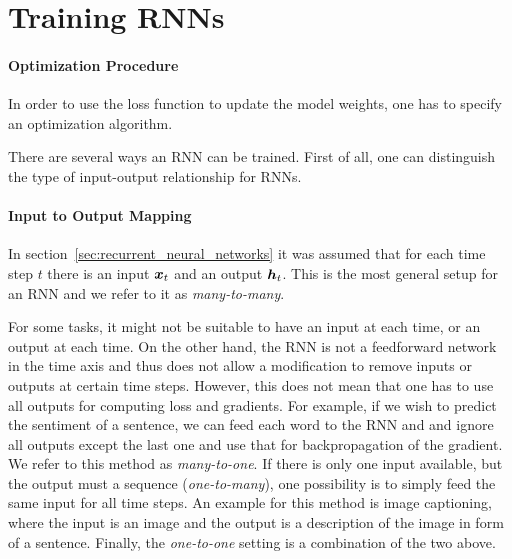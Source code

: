 	\section{Training RNNs}
		
		\paragraph{Optimization Procedure}
		In order to use the loss function to update the model weights, one has to specify an optimization algorithm.

		
		There are several ways an RNN can be trained.
		First of all, one can distinguish the type of input-output relationship for RNNs.
		
		\paragraph{Input to Output Mapping}
		In section~\ref{sec:recurrent_neural_networks} it was assumed that for each time step $t$ there is an input $\bm{x}_t$ and an output $\bm{h}_t$.
		This is the most general setup for an RNN and we refer to it as \emph{many-to-many}. 
		
		For some tasks, it might not be suitable to have an input at each time, or an output at each time.
		On the other hand, the RNN is not a feedforward network in the time axis and thus does not allow a modification to remove inputs or outputs at certain time steps.
		However, this does not mean that one has to use all outputs for computing loss and gradients.
		For example, if we wish to predict the sentiment of a sentence, we can feed each word to the RNN and and ignore all outputs except the last one and use that for backpropagation of the gradient.
		We refer to this method as \emph{many-to-one}.
		If there is only one input available, but the output must a sequence (\emph{one-to-many}), one possibility is to simply feed the same input for all time steps.
		An example for this method is image captioning, where the input is an image and the output is a description of the image in form of a sentence. 
		Finally, the \emph{one-to-one} setting is a combination of the two above.
		
